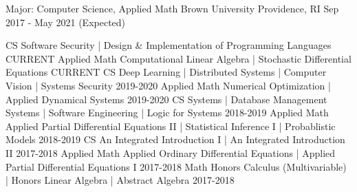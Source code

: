 \begin{cventries}
  \cventry
    {Major: Computer Science, Applied Math}
    {Brown University}
    {Providence, RI}
    {Sep 2017 - May 2021 (Expected)}
    {
        \vspace{-2em}
        \begin{cvhonors}
			\cvhonor
			{CS}
            {Software Security | Design \& Implementation of Programming Languages}
			{}
            {CURRENT}
			\cvhonor
			{Applied Math}
            {Computational Linear Algebra | Stochastic Differential Equations}
			{}
            {CURRENT}
			\cvhonor
			{CS}
            {Deep Learning | Distributed Systems | Computer Vision | Systems Security}
			{}
			{2019-2020}
			\cvhonor
			{Applied Math}
			{Numerical Optimization | Applied Dynamical Systems}
			{}
			{2019-2020}
			\cvhonor
			{CS}
			{Systems | Database Management Systems | Software Engineering | Logic for Systems}
			{}
			{2018-2019}
			\cvhonor
			{Applied Math}
            {Applied Partial Differential Equations II | Statistical Inference I | Probablistic Models}
			{}
			{2018-2019}
			\cvhonor
			{CS}
			{An Integrated Introduction I | An Integrated Introduction II}
			{}
			{2017-2018}
			\cvhonor
			{Applied Math}
			{Applied Ordinary Differential Equations | Applied Partial Differential Equations I}
			{}
			{2017-2018}
			\cvhonor
			{Math}
			{Honors Calculus (Multivariable) | Honors Linear Algebra | Abstract Algebra}
			{}
			{2017-2018}
        \end{cvhonors}
		\vspace{-1.25em}
    }
\end{cventries}

